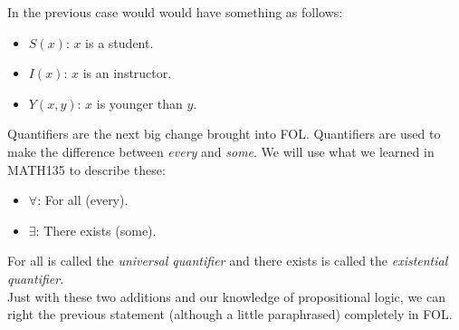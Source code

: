 In the previous case would would have something as follows:\\
\begin{itemize}
\item $S(x)$:	$x$ is a student.
\item $I(x)$:	$x$ is an instructor.
\item $Y(x,y)$:	$x$ is younger than $y$.
\end{itemize}

Quantifiers are the next big change brought into FOL.  Quantifiers are used to make the difference between \emph{every} and \emph{some}.  We will use what we learned in MATH135 to describe these:\\
\begin{itemize}
\item $\forall$:	For all (every).
\item $\exists$:	There exists (some).
\end{itemize}

For all is called the \emph{universal quantifier} and there exists is called the \emph{existential quantifier}.\\

Just with these two additions and our knowledge of propositional logic, we can right the previous statement (although a little paraphrased) completely in FOL.


